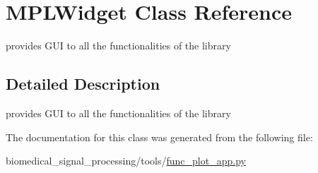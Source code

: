 \hypertarget{classMPLWidget}{}\section{M\+P\+L\+Widget Class Reference}
\label{classMPLWidget}


provides G\+UI to all the functionalities of the library  




\subsection{Detailed Description}
provides G\+UI to all the functionalities of the library 

The documentation for this class was generated from the following file\+:\begin{DoxyCompactItemize}
\item 
biomedical\+\_\+signal\+\_\+processing/tools/\hyperlink{func__plot__app_8py}{func\+\_\+plot\+\_\+app.\+py}\end{DoxyCompactItemize}
